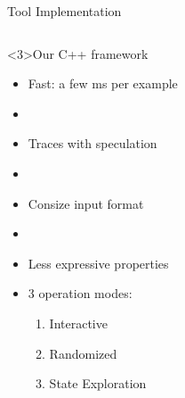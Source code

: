 \documentclass{beamer}
\newcommand{\cmark}{\textcolor{green!70!black}{\ding{51}}} %
\newcommand{\xmark}{\textcolor{red}{\ding{55}}}            %
\begin{document}
\begin{frame}{Tool Implementation}
\begin{columns}[t]
        
        \begin{exampleblock}<3>{Our C++ framework}
            \begin{itemize}
                \item[\cmark] Fast: a few ms per example
                \item[ ]
                \item[\cmark] Traces with speculation
                \item[ ] 
                \item[\cmark] Consize input format
                \item[] 
                \item[\xmark] Less expressive properties
                \item[\cmark] 3 operation modes:
                \begin{enumerate}
                    \item Interactive
                    \item Randomized
                    \item State Exploration
                \end{enumerate}
            \end{itemize}
        \end{exampleblock}
    \end{columns}

\end{frame}
\end{document}

